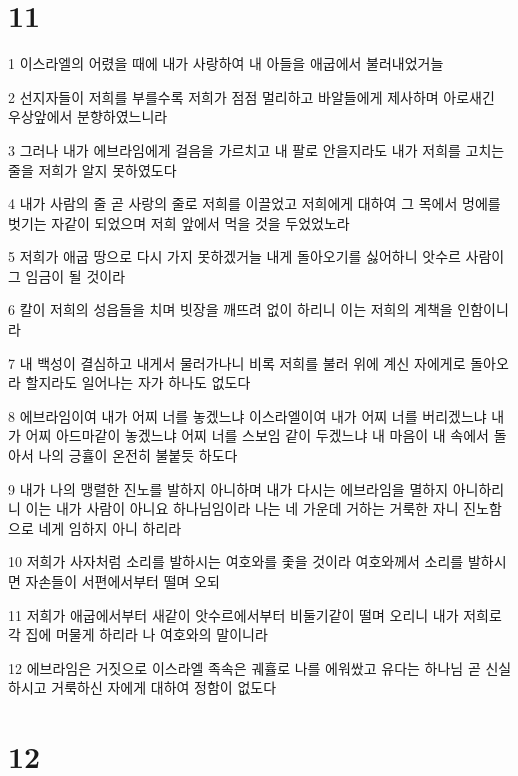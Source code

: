 \chapter{11}

\par 1 이스라엘의 어렸을 때에 내가 사랑하여 내 아들을 애굽에서 불러내었거늘
\par 2 선지자들이 저희를 부를수록 저희가 점점 멀리하고 바알들에게 제사하며 아로새긴 우상앞에서 분향하였느니라
\par 3 그러나 내가 에브라임에게 걸음을 가르치고 내 팔로 안을지라도 내가 저희를 고치는 줄을 저희가 알지 못하였도다
\par 4 내가 사람의 줄 곧 사랑의 줄로 저희를 이끌었고 저희에게 대하여 그 목에서 멍에를 벗기는 자같이 되었으며 저희 앞에서 먹을 것을 두었었노라
\par 5 저희가 애굽 땅으로 다시 가지 못하겠거늘 내게 돌아오기를 싫어하니 앗수르 사람이 그 임금이 될 것이라
\par 6 칼이 저희의 성읍들을 치며 빗장을 깨뜨려 없이 하리니 이는 저희의 계책을 인함이니라
\par 7 내 백성이 결심하고 내게서 물러가나니 비록 저희를 불러 위에 계신 자에게로 돌아오라 할지라도 일어나는 자가 하나도 없도다
\par 8 에브라임이여 내가 어찌 너를 놓겠느냐 이스라엘이여 내가 어찌 너를 버리겠느냐 내가 어찌 아드마같이 놓겠느냐 어찌 너를 스보임 같이 두겠느냐 내 마음이 내 속에서 돌아서 나의 긍휼이 온전히 불붙듯 하도다
\par 9 내가 나의 맹렬한 진노를 발하지 아니하며 내가 다시는 에브라임을 멸하지 아니하리니 이는 내가 사람이 아니요 하나님임이라 나는 네 가운데 거하는 거룩한 자니 진노함으로 네게 임하지 아니 하리라
\par 10 저희가 사자처럼 소리를 발하시는 여호와를 좇을 것이라 여호와께서 소리를 발하시면 자손들이 서편에서부터 떨며 오되
\par 11 저희가 애굽에서부터 새같이 앗수르에서부터 비둘기같이 떨며 오리니 내가 저희로 각 집에 머물게 하리라 나 여호와의 말이니라
\par 12 에브라임은 거짓으로 이스라엘 족속은 궤휼로 나를 에워쌌고 유다는 하나님 곧 신실하시고 거룩하신 자에게 대하여 정함이 없도다

\chapter{12}


